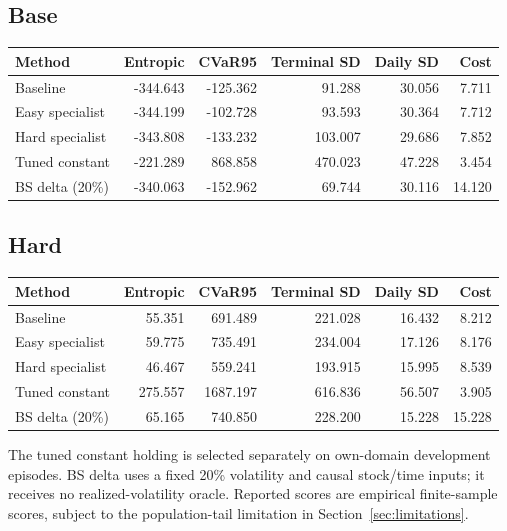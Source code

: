 \documentclass[11pt,a4paper]{article}
\begin{document}
\subsection*{Base}
\begin{small}
\begin{tabular}{lrrrrr}
\toprule
Method & Entropic & CVaR95 & Terminal SD & Daily SD & Cost \\
\midrule
Baseline & -344.643 & -125.362 & 91.288 & 30.056 & 7.711 \\
Easy specialist & -344.199 & -102.728 & 93.593 & 30.364 & 7.712 \\
Hard specialist & -343.808 & -133.232 & 103.007 & 29.686 & 7.852 \\
Tuned constant & -221.289 & 868.858 & 470.023 & 47.228 & 3.454 \\
BS delta (20\%) & -340.063 & -152.962 & 69.744 & 30.116 & 14.120 \\
\bottomrule
\end{tabular}
\end{small}\par\medskip

\subsection*{Hard}
\begin{small}
\begin{tabular}{lrrrrr}
\toprule
Method & Entropic & CVaR95 & Terminal SD & Daily SD & Cost \\
\midrule
Baseline & 55.351 & 691.489 & 221.028 & 16.432 & 8.212 \\
Easy specialist & 59.775 & 735.491 & 234.004 & 17.126 & 8.176 \\
Hard specialist & 46.467 & 559.241 & 193.915 & 15.995 & 8.539 \\
Tuned constant & 275.557 & 1687.197 & 616.836 & 56.507 & 3.905 \\
BS delta (20\%) & 65.165 & 740.850 & 228.200 & 15.228 & 15.228 \\
\bottomrule
\end{tabular}
\end{small}\par\medskip
The tuned constant holding is selected separately on own-domain development episodes. BS delta uses a fixed 20\% volatility and causal stock/time inputs; it receives no realized-volatility oracle. Reported scores are empirical finite-sample scores, subject to the population-tail limitation in Section~\ref{sec:limitations}.
\clearpage
\end{document}
